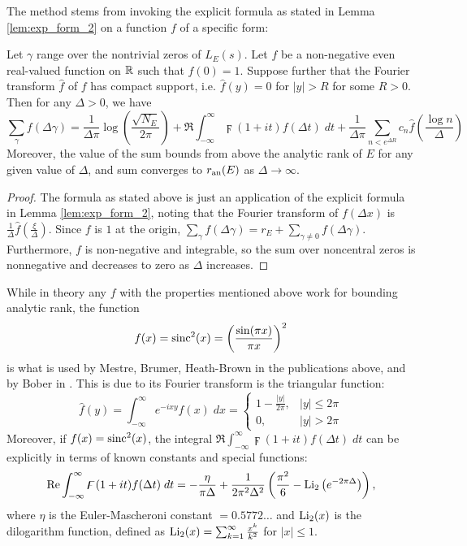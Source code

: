 The method stems from invoking the explicit formula as stated in Lemma \ref{lem:exp_form_2} on a function $f$ of a specific form:
\begin{lemma}\label{lem:exp_form_nonneg_f_cpt_suppt}
Let $\gamma$ range over the nontrivial zeros of $L_E(s)$. Let $f$ be a non-negative even real-valued function on $\mathbb{R}$ such that $f(0)=1$. Suppose further that the Fourier transform $\hat{f}$ of $f$ has compact support, i.e. $\hat{f}(y) = 0$ for $|y|>R$ for some $R>0$. Then for any $\Delta>0$, we have
\begin{equation}
\sum_{\gamma} f(\Delta \gamma) = \frac{1}{\Delta \pi}\log\left(\frac{\sqrt{N_E}}{2\pi}\right) + \Re\int_{-\infty}^{\infty} \digamma(1+it)f(\Delta t) \; dt  + \frac{1}{\Delta \pi}\sum_{n<e^{\Delta R}} c_n \hat{f}\left(\frac{\log n}{\Delta}\right)
\end{equation}
Moreover, the value of the sum bounds from above the analytic rank of $E$ for any given value of $\Delta$, and sum converges to $r_{{\rm an}}(E)$ as $\Delta \to \infty$.
\end{lemma}

\begin{proof}
The formula as stated above is just an application of the explicit formula in Lemma \ref{lem:exp_form_2}, noting that the Fourier transform of $f(\Delta x)$ is $\frac{1}{\Delta}\hat{f}\left(\frac{\xi}{\Delta}\right)$. Since $f$ is $1$ at the origin, $\sum_{\gamma} f(\Delta \gamma) = r_E + \sum_{\gamma\ne 0} f(\Delta \gamma)$. Furthermore, $f$ is non-negative and integrable, so the sum over noncentral zeros is nonnegative and decreases to zero as $\Delta$ increases.
\end{proof}

While in theory any $f$ with the properties mentioned above work for bounding analytic rank, the function
\begin{equation}
f(x) = \text{sinc}^2(x) = \left(\frac{\sin(\pi x)}{\pi x}\right)^2
\end{equation}
is what is used by Mestre, Brumer, Heath-Brown in the publications above, and by Bober in \cite{Bob-2011}. This is due to its Fourier transform is the triangular function:
\begin{equation}
\hat{f}(y) = \int_{-\infty}^{\infty} e^{-i x y}f(x)\; dx =  \begin{cases} 1 - \frac{|y|}{2\pi}, & |y|\le 2\pi \\ 0, & |y| > 2\pi\end{cases}
\end{equation}
Moreover, if $f(x) = \text{sinc}^2(x)$, the integral $\Re\int_{-\infty}^{\infty} \digamma(1+it)f(\Delta t) \; dt$ can be explicitly in terms of known constants and special functions:
\begin{equation}
\mbox{\rm Re}\int_{-\infty}^{\infty} \digamma(1+it)f(\Delta t) \; dt = - \frac{\eta}{\pi \Delta} + \frac{1}{2\pi^2 \Delta^2}\left(\frac{\pi^2}{6} - \text{Li}_2\left(e^{-2\pi \Delta}\right)\right),
\end{equation}
where $\eta$ is the Euler-Mascheroni constant $= 0.5772\ldots$ and $\text{Li}_2(x)$ is the dilogarithm function, defined as $\text{Li}_2(x) = \sum_{k=1}^{\infty} \frac{x^k}{k^2}$ for $|x|\le 1$.

